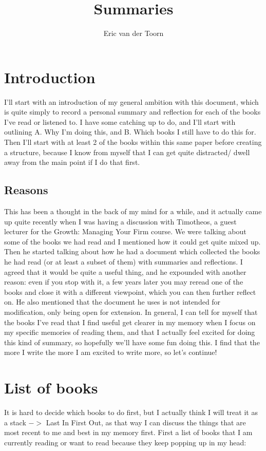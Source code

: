 \documentclass[12pt,a4paper]{article}
\author{Eric van der Toorn}
\title{Summaries}
\begin{document}
\maketitle
\section{Introduction}
I'll start with an introduction of my general ambition with this document, which is quite simply to record a personal summary and reflection for each of the books I've read or listened to. I have some catching up to do, and I'll start with outlining A. Why I'm doing this, and B. Which books I still have to do this for. Then I'll start with at least 2 of the books within this same paper before creating a structure, because I know from myself that I can get quite distracted/ dwell away from the main point if I do that first.
\subsection{Reasons}
This has been a thought in the back of my mind for a while, and it actually came up quite recently when I was having a discussion with Timotheos, a guest lecturer for the Growth: Managing Your Firm course. We were talking about some of the books we had read and I mentioned how it could get quite mixed up. Then he started talking about how he had a document which collected the books he had read (or at least a subset of them) with summaries and reflections. I agreed that it would be quite a useful thing, and he expounded with another reason: even if you stop with it, a few years later you may reread one of the books and close it with a different viewpoint, which you can then further reflect on. He also mentioned that the document he uses is not intended for modification, only being open for extension.
In general, I can tell for myself that the books I've read that I find useful get clearer in my memory when I focus on my specific memories of reading them, and that I actually feel excited for doing this kind of summary, so hopefully we'll have some fun doing this. I find that the more I write the more I am excited to write more, so let's continue!

\section{List of books}
It is hard to decide which books to do first, but I actually think I will treat it as a stack $->$ Last In First Out, as that way I can discuss the things that are most recent to me and best in my memory first. 
First a list of books that I am currently reading or want to read because they keep popping up in my head:
\end{document}
